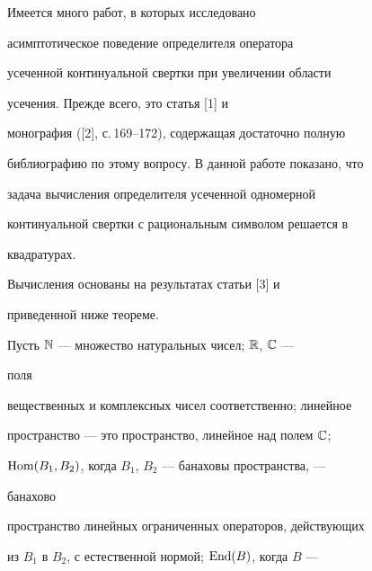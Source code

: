  


\date{} 




\pagestyle{plain} %


 




\maketitle 


\label{begin} 


 


 


Имеется много работ, в которых исследовано 


асимптотическое поведение определителя оператора 


усеченной континуальной свертки при увеличении области 


усечения. Прежде всего, это статья [1] и 


монография ([2], с.\,169--172), содержащая достаточно полную 


библиографию по этому вопросу. В данной работе показано, что 


задача вычисления определителя усеченной одномерной 


континуальной свертки с рациональным символом решается в 


квадратурах. 


Вычисления основаны на результатах статьи [3] и 


приведенной ниже теореме. 


 


Пусть $\Bbb N$ --- множество натуральных чисел; $\Bbb R$, $\Bbb C$ --- 


поля 


вещественных и комплексных чисел соответственно; линейное 


пространство --- это пространство, линейное над полем $\Bbb C$; 


$\operatorname{Hom}(B_1,B_2)$, когда $B_1$, $B_2$ --- банаховы пространства, --- 


банахово 


пространство линейных ограниченных операторов, действующих 


из $B_1$ в $B_2$, с естественной нормой; $\operatorname{End}(B)$, когда $B$ --- 


